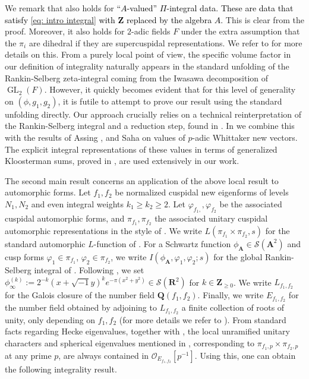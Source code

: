 \documentclass{amsart}
\theoremstyle{plain}
\theoremstyle{plain}
\theoremstyle{remark}
\DeclareMathOperator{\GL}{GL}
\begin{document}
We remark that  also holds for \textcolor{black}{``$A$-valued'' $\Pi$-integral data. These are data that satisfy \eqref{eq: intro integral} with $\mathbf{Z}$ replaced by the algebra $A$.} This is clear from the proof. Moreover, it also holds for $2$-adic fields $F$ under the extra assumption that the $\pi_i$ are dihedral if they are supercuspidal representations. We refer to  for more details on this. From a purely local point of view, the specific volume factor in our definition of integrality naturally appears in the standard unfolding of the Rankin-Selberg zeta-integral coming from the Iwasawa decomposition of $\GL_2(F)$. However, it quickly becomes evident that for this level of generality on $(\phi,g_1,g_2)$, it is futile to attempt to prove our result using the standard unfolding directly. Our approach crucially relies on a technical reinterpretation of the Rankin-Selberg integral and a reduction step, found in . In  we combine this with the results of Assing \cite{Assing_2018}, and Saha \cite{Saha_2015} on values of $p$-adic Whittaker new vectors. The explicit integral representations of these values in terms of generalized Kloosterman sums, proved in \cite{Assing_2018}, are used extensively in our work. 

The second main result concerns an application of the above local result to automorphic forms. Let $f_1,f_2$ be normalized cuspidal new eigenforms of levels $N_1,N_2$ and even integral weights $k_1\geq k_2\geq 2$. Let $\varphi_{f_1,},\varphi_{f_2}$ be the associated cuspidal automorphic forms, and $\pi_{f_1},\pi_{f_2}$ the associated unitary cuspidal automorphic representations in the style of \cite{gelbart1975automorphic}. We write $L(\pi_{f_1}\times\pi_{f_2},s)$ for the standard automorphic $L$-function of \cite{jacquet1981euler}. For a Schwartz function $\phi_\mathbf{A}\in\mathcal{S}(\mathbf{A}^2)$ and cusp forms $\varphi_1\in\pi_{f_1}$, $\varphi_2\in\pi_{f_2}$, we write $I(\phi_\mathbf{A},\varphi_1,\varphi_2;s)$ for the global Rankin-Selberg integral of \cite{jacquet1981euler}. Following \cite{chen2020primitive}, we set $\phi_\infty^{(k)}:=2^{-k}(x+\sqrt{-1}y)^ke^{-\pi(x^2+y^2)}\in\mathcal{S}(\mathbf{R}^2)$ for $k\in\mathbf{Z}_{\geq 0}$. We write $L_{f_1,f_2}$ for the Galois closure of the number field $\mathbf{Q}(f_1,f_2)$. Finally, we write $E_{f_1,f_2}$ for the number field obtained by adjoining to $L_{f_1,f_2}$ a finite collection of roots of unity, only depending on $f_1,f_2$ (for more details we refer to ). From standard facts regarding Hecke eigenvalues, together with \cite{loeffler2012computation}, the local unramified unitary characters and spherical eigenvalues mentioned in , corresponding to $\pi_{f_1,p}\times\pi_{f_2,p}$ at any prime $p$, are always contained in $\mathcal{O}_{E_{f_1,f_2}}[p^{-1}]$. Using this, one can obtain the following integrality result.
\end{document}
